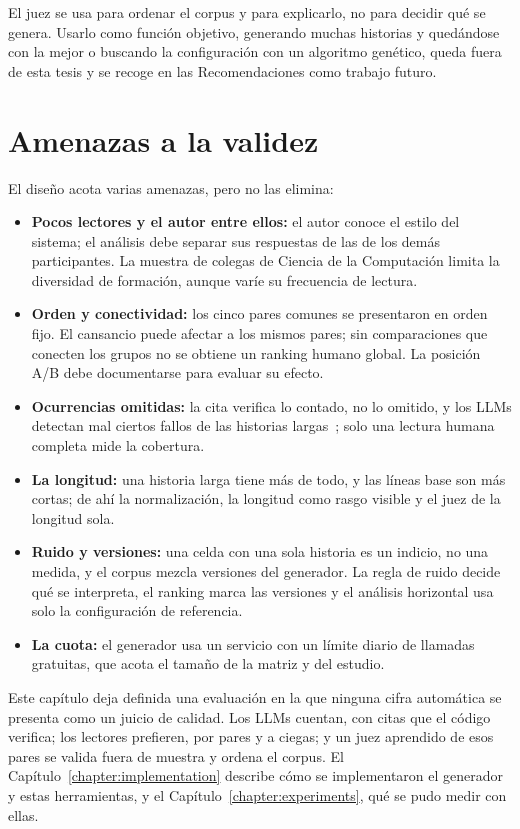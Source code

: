 El juez se usa para ordenar el corpus y para explicarlo, no para decidir qué se genera. Usarlo como
función objetivo, generando muchas historias y quedándose con la mejor o buscando la configuración
con un algoritmo genético, queda fuera de esta tesis y se recoge en las Recomendaciones como trabajo
futuro.

\section{Amenazas a la validez}\label{sec:amenazas}

El diseño acota varias amenazas, pero no las elimina:

\begin{itemize}
  \item \textbf{Pocos lectores y el autor entre ellos:} el autor conoce el estilo del sistema; el
  análisis debe separar sus respuestas de las de los demás participantes. La muestra de colegas de
  Ciencia de la Computación limita la diversidad de formación, aunque varíe su frecuencia de lectura.
  \item \textbf{Orden y conectividad:} los cinco pares comunes se presentaron en orden fijo. El
  cansancio puede afectar a los mismos pares; sin comparaciones que conecten los grupos no se
  obtiene un ranking humano global. La posición A/B debe documentarse para evaluar su efecto.
  \item \textbf{Ocurrencias omitidas:} la cita verifica lo contado, no lo omitido, y los LLMs
  detectan mal ciertos fallos de las historias largas~\cite{ahuja2025}; solo una lectura humana
  completa mide la cobertura.
  \item \textbf{La longitud:} una historia larga tiene más de todo, y las líneas base son más cortas;
  de ahí la normalización, la longitud como rasgo visible y el juez de la longitud sola.
  \item \textbf{Ruido y versiones:} una celda con una sola historia es un indicio, no una medida, y
  el corpus mezcla versiones del generador. La regla de ruido decide qué se interpreta, el ranking
  marca las versiones y el análisis horizontal usa solo la configuración de referencia.
  \item \textbf{La cuota:} el generador usa un servicio con un límite diario de llamadas gratuitas,
  que acota el tamaño de la matriz y del estudio.
\end{itemize}

Este capítulo deja definida una evaluación en la que ninguna cifra automática se presenta como un
juicio de calidad. Los LLMs cuentan, con citas que el código verifica; los lectores prefieren, por
pares y a ciegas; y un juez aprendido de esos pares se valida fuera de muestra y ordena el corpus. El
Capítulo~\ref{chapter:implementation} describe cómo se implementaron el generador y estas
herramientas, y el Capítulo~\ref{chapter:experiments}, qué se pudo medir con ellas.
